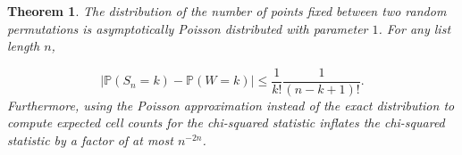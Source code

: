 \documentclass[12pt]{article}
\newtheorem{theorem}{Theorem}[section]
\newcommand{\eps}{\varepsilon}
\begin{document}
%
%



\begin{theorem}\label{thm:poisson_approx}
The distribution of the number of points fixed between two random permutations is asymptotically Poisson distributed with parameter $1$.
For any list length $n$,

$$\lvert \mathbb{P}(S_n = k)-\mathbb{P}(W = k)\rvert \leq \frac{1}{k!}\frac{1}{(n-k+1)!}.$$
Furthermore, using the Poisson approximation instead of the exact distribution to compute expected cell counts for the chi-squared statistic inflates the chi-squared statistic by a factor of at most $n^{-2n}$.


\end{theorem}
\end{document}
